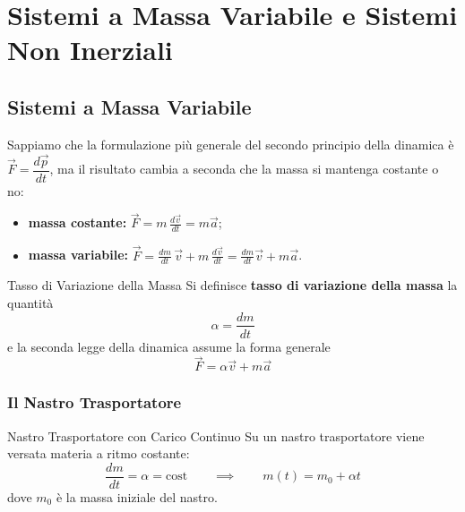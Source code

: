 \chapter{Sistemi a Massa Variabile e Sistemi Non Inerziali}

\section{Sistemi a Massa Variabile}

Sappiamo che la formulazione più generale del secondo principio della dinamica è $\vec{F} = \dfrac{d\vec{p}}{dt}$, ma il risultato cambia a seconda che la massa si mantenga costante o no:
\begin{itemize}
    \item \textbf{massa costante:} $\displaystyle \vec{F} = m\,\frac{d\vec{v}}{dt} = m\vec{a}$;
    \item \textbf{massa variabile:} $\displaystyle \vec{F} = \frac{dm}{dt}\,\vec{v} + m\,\frac{d\vec{v}}{dt} = \frac{dm}{dt}\vec{v} + m\vec{a}$.
\end{itemize}

\begin{definizione}{Tasso di Variazione della Massa}
Si definisce \textbf{tasso di variazione della massa} la quantità
\begin{equation}
    \alpha = \frac{dm}{dt}
\end{equation}
e la seconda legge della dinamica assume la forma generale
\begin{equation}
    \vec{F} = \alpha \vec{v} + m\vec{a}
\end{equation}
\end{definizione}

\subsection{Il Nastro Trasportatore}

\begin{esempio}{Nastro Trasportatore con Carico Continuo}
Su un nastro trasportatore viene versata materia a ritmo costante:
\begin{equation}
    \frac{dm}{dt} = \alpha = \text{cost}
    \qquad \implies \qquad
    m(t) = m_0 + \alpha t
\end{equation}
dove $m_0$ è la massa iniziale del nastro.
\end{esempio}

